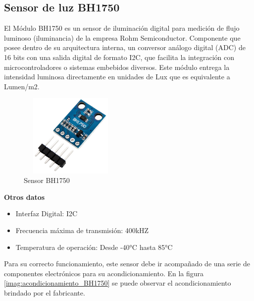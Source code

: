 \vspace{5cm}

\subsection{Sensor de luz BH1750}

El Módulo BH1750 es un sensor de iluminación digital para medición de flujo luminoso (iluminancia) de la empresa Rohm Semiconductor. Componente que posee dentro de su arquitectura interna, un conversor análogo digital (ADC) de 16 bits con una salida digital de formato I2C, que facilita la integración con microcontroladores o sistemas embebidos diversos. Este módulo entrega la intensidad luminosa directamente en unidades de Lux que es equivalente a Lumen/m2.\\

\begin{figure}[H]
    \centering
    \includegraphics[width=5cm, height=4cm]{imagenes/Sensor BH1750.jpg}
    \caption{Sensor BH1750}
    \label{imag:BH1750}
 \end{figure}

\textbf{Otros datos}

\begin{itemize}
    \item Interfaz Digital: I2C
    \item Frecuencia máxima de transmisión: 400kHZ
    \item Temperatura de operación: Desde -40°C hasta 85°C
\end{itemize}

Para su correcto funcionamiento, este sensor debe ir acompañado de una serie de componentes electrónicos para su acondicionamiento.
En la figura \ref{imag:acondicionamiento_BH1750} se puede observar el acondicionamiento brindado por el fabricante.

